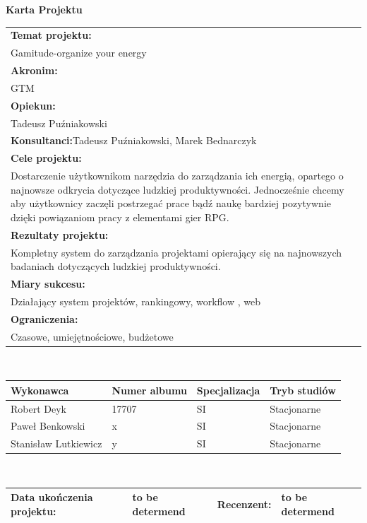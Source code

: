 \documentclass[a4paper,11pt]{report}
\begin{document}
\begin{center}
\textbf{\huge Karta Projektu}\\
\vspace{1cm}
\begin{tabular}{|p{15cm}|}
\hline
\textbf{Temat projektu:}\\Gamitude-organize your energy\\ 
\hline
\textbf{Akronim:}\\GTM\\
\hline
\textbf{Opiekun:}\\Tadeusz Puźniakowski \\
\hline
\textbf{Konsultanci:}Tadeusz Puźniakowski, Marek Bednarczyk \\
\hline
\textbf{Cele projektu:}\\Dostarczenie użytkownikom narzędzia do zarządzania ich energią, opartego o najnowsze odkrycia dotyczące ludzkiej produktywności. Jednocześnie chcemy aby użytkownicy zaczęli postrzegać prace bądź naukę bardziej pozytywnie dzięki powiązaniom pracy z elementami gier RPG.\\
\hline
\textbf{Rezultaty projektu:}\\Kompletny system do zarządzania projektami opierający się na najnowszych badaniach dotyczących ludzkiej produktywności. \\
\hline
\textbf{Miary sukcesu:}\\Działający system projektów, rankingowy, workflow , web \\
\hline
\textbf{Ograniczenia:}\\Czasowe, umiejętnościowe, budżetowe \\
\hline
\end{tabular}\\
\vspace{1cm}
\begin{tabular}{|l|l|l|l|}
\hline
\textbf{Wykonawca} & \textbf{Numer albumu}& \textbf{Specjalizacja}& \textbf{Tryb studiów} \\
\hline
Robert Deyk &17707&SI&Stacjonarne \\
\hline
Paweł Benkowski&x&SI&Stacjonarne\\
\hline
Stanisław Lutkiewicz&y&SI&Stacjonarne \\
\hline
\end{tabular}\\
\vspace{1cm}
\begin{tabular}{|l|l|l|l|}
\hline
\textbf{Data ukończenia projektu:} & to be determend & \textbf{Recenzent:} & to be determend\\
\hline
\end{tabular}
\end{center}
\end{document}
